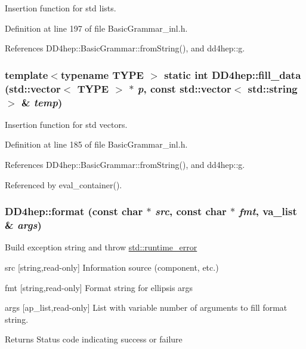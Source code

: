 Insertion function for std lists. 

Definition at line 197 of file BasicGrammar\_\-inl.h.

References DD4hep::BasicGrammar::fromString(), and dd4hep::g.\hypertarget{namespace_d_d4hep_a4c98609dd61d7bfb5450df588fa2ef7f}{
\subsubsection[{fill\_\-data}]{\setlength{\rightskip}{0pt plus 5cm}template$<$typename TYPE $>$ static int DD4hep::fill\_\-data (std::vector$<$ TYPE $>$ $\ast$ {\em p}, \/  const std::vector$<$ std::string $>$ \& {\em temp})}}
\label{namespace_d_d4hep_a4c98609dd61d7bfb5450df588fa2ef7f}


Insertion function for std vectors. 

Definition at line 185 of file BasicGrammar\_\-inl.h.

References DD4hep::BasicGrammar::fromString(), and dd4hep::g.

Referenced by eval\_\-container().\hypertarget{namespace_d_d4hep_a2d9fc6b33e6b8890a8974aa6ccee4b1c}{
\subsubsection[{format}]{ DD4hep::format (const char $\ast$ {\em src}, \/  const char $\ast$ {\em fmt}, \/  va\_\-list \& {\em args})}}
\label{namespace_d_d4hep_a2d9fc6b33e6b8890a8974aa6ccee4b1c}
Build exception string and throw \hyperlink{classstd_1_1runtime__error}{std::runtime\_\-error} \begin{DoxyItemize}
\item src \mbox{[}string,read-\/only\mbox{]} Information source (component, etc.) \item fmt \mbox{[}string,read-\/only\mbox{]} Format string for ellipsis args \item args \mbox{[}ap\_\-list,read-\/only\mbox{]} List with variable number of arguments to fill format string. \begin{DoxyReturn}{Returns}
Status code indicating success or failure 
\end{DoxyReturn}
\end{DoxyItemize}


